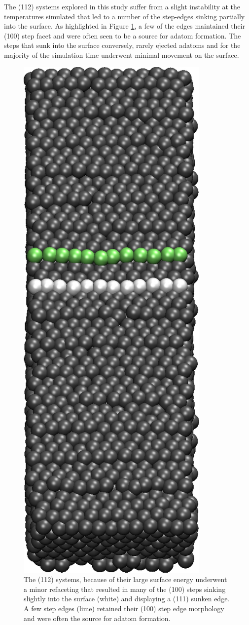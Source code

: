 The (112) systems explored in this study suffer from a slight instability at
the temperatures simulated that led to a number of the step-edges sinking
partially into the surface. As highlighted in Figure \ref{fig:112sunken}, a few
of the edges maintained their (100) step facet and were often seen to be a
source for adatom formation. The steps that sunk into the surface conversely,
rarely ejected adatoms and for the majority of the simulation time underwent
minimal movement on the surface.

\begin{figure}
\centering
\includegraphics[width=0.4\linewidth]{../figures/appB/112_sunken.pdf}
\caption{The (112) systems, because of their large surface energy underwent a
minor refaceting that resulted in many of the (100) steps sinking slightly into
the surface (white) and displaying a (111) sunken edge. A few step edges (lime)
retained their (100) step edge morphology and were often the source for adatom
formation.}
\label{fig:112sunken}
\end{figure}
\newpage



